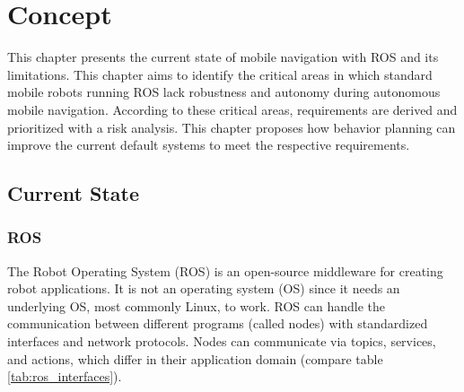 \chapter{Concept}
\label{cha:methoden}

This chapter presents the current state of mobile navigation with ROS and its limitations. This chapter aims to identify the critical areas in which standard mobile robots running ROS lack robustness and autonomy during autonomous mobile navigation. According to these critical areas, requirements are derived and prioritized with a risk analysis. This chapter proposes how behavior planning can improve the current default systems to meet the respective requirements. 

\section{Current State}
\label{sec:Current State}

\subsection{ROS}
The Robot Operating System (ROS) is an open-source middleware for creating robot applications. It is not an operating system (OS) since it needs an underlying OS, most commonly Linux, to work. ROS can handle the communication between different programs (called nodes) with standardized interfaces and network protocols. Nodes can communicate via topics, services, and actions, which differ in their application domain (compare table \ref{tab:ros_interfaces}). 

\begin{table}[ht]
	\centering
	\caption{ROS Communication Options}
	\label{tab:ros_interfaces}
	\renewcommand{\arraystretch}{1.5}
\end{table}

